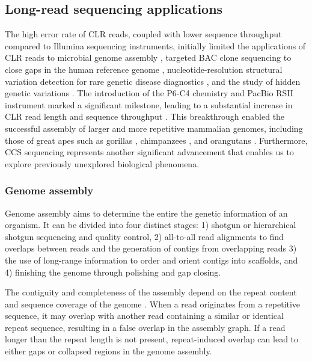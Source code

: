 \subsection{Long-read sequencing applications}

The high error rate of CLR reads, coupled with lower sequence throughput compared to Illumina sequencing instruments, initially limited the applications of CLR reads to microbial genome assembly \cite{Chin2013-hp}, targeted BAC clone sequencing to close gaps in the human reference genome \cite{Huddleston2014-rs}, nucleotide-resolution structural variation detection for rare genetic disease diagnostics \cite{Loomis2013-ca}, and the study of hidden genetic variations \cite{Chaisson2015-zz}. The introduction of the P6-C4 chemistry and PacBio RSII instrument marked a significant milestone, leading to a substantial increase in CLR read length and sequence throughput \cite{Rhoads2015-pk}. This breakthrough enabled the successful assembly of larger and more repetitive mammalian genomes, including those of great apes such as gorillas \cite{Gordon2016-ho}, chimpanzees \cite{Kronenberg2018-wy}, and orangutans \cite{Kronenberg2018-wy}. Furthermore, CCS sequencing represents another significant advancement that enables us to explore previously unexplored biological phenomena.

\subsubsection{Genome assembly}

Genome assembly aims to determine the entire the genetic information of an organism. It can be divided into four distinct stages: 1) shotgun or hierarchical shotgun sequencing and quality control, 2) all-to-all read alignments to find overlaps between reads and the generation of contigs from overlapping reads 3) the use of long-range information to order and orient contigs into scaffolds, and 4) finishing the genome through polishing and gap closing.

The contiguity and completeness of the assembly depend on the repeat content and sequence coverage of the genome \cite{Lander1988-hu}. When a read originates from a repetitive sequence, it may overlap with another read containing a similar or identical repeat sequence, resulting in a false overlap in the assembly graph. If a read longer than the repeat length is not present, repeat-induced overlap can lead to either gaps or collapsed regions in the genome assembly.

